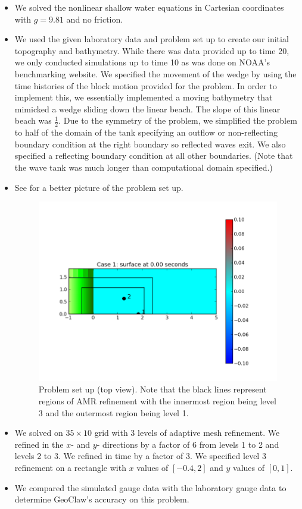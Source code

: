 \begin{itemize}
\item We solved the nonlinear shallow water equations in Cartesian
coordinates with $g=9.81$ and no friction.

\item We used the given laboratory data and problem set up to create our
initial topography and bathymetry.  While there was data provided up to
time 20, we only conducted simulations up to time 10 as was done on 
NOAA's benchmarking website.  We specified the movement of the wedge
by using the time histories of the block motion provided for the problem.  
In order to implement this, we essentially implemented a moving bathymetry
that mimicked a wedge sliding down the linear beach.  The slope of this linear
beach was $\frac{1}{2}$.  Due to the symmetry of the problem, we simplified the
problem to half of the domain of the tank specifying an outflow or non-reflecting
boundary condition at the right boundary so reflected waves exit.  We also
specified a reflecting boundary condition at all other boundaries.
(Note that the wave tank was much longer than computational domain specified.)

\item See  for a better picture of the problem set up.

\begin{figure}[ht]
\includegraphics[width=4 in]{bp12/case1pcolor0.png}
\caption{\label{fig:bp8pcolor1}
Problem set up (top view).  Note that the black lines represent regions of 
AMR refinement with the innermost region being level 3 and the outermost
region being level 1.
  }
\end{figure}

\item We solved on $35\times 10$ grid with 3 levels of adaptive mesh refinement.
We refined in the $x$- and $y$- directions by a factor of 6 from levels 1 to 2 and
levels 2 to 3.  We refined in time by a factor of 3.  We specified level 3 refinement
on a rectangle with $x$ values of $[-0.4, 2]$ and $y$ values of $[0, 1]$.

\item We compared the simulated gauge data with the laboratory gauge data 
to determine GeoClaw's accuracy on this problem.
\end{itemize}

